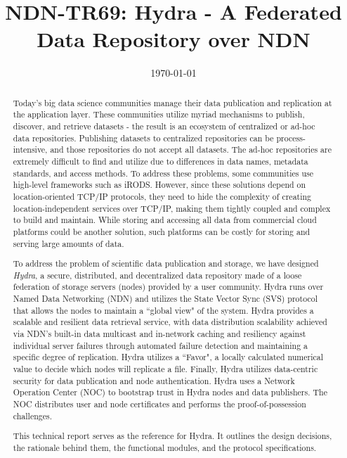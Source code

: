 \documentclass[10pt, sigconf]{acmart}
\begin{document}
\title{NDN-TR69: Hydra - A Federated Data Repository over NDN}
\author{}
\date{\today}

\tableofcontents
\begin{abstract}
Today's big data science communities manage their data publication and replication at the application layer. These communities utilize myriad mechanisms to publish, discover, and retrieve datasets - the result is an ecosystem of centralized or ad-hoc data repositories. Publishing datasets to centralized repositories can be process-intensive, and those repositories do not accept all datasets. The ad-hoc repositories are extremely difficult to find and utilize due to differences in data names, metadata standards, and access methods. To address these problems, some communities use high-level frameworks such as iRODS. However,  since these solutions depend on location-oriented TCP/IP protocols, they need to hide the complexity of creating location-independent services over TCP/IP, making them tightly coupled and complex to build and maintain. While storing and accessing all data from commercial cloud platforms could be another solution, such platforms can be costly for storing and serving large amounts of data.

To address the problem of scientific data publication and storage, we have designed \textit{Hydra}, a secure, distributed, and decentralized data repository made of a loose federation of storage servers (nodes) provided by a user community. Hydra runs over Named Data Networking (NDN) and utilizes the State Vector Sync (SVS) protocol that allows the nodes to maintain a ``global view" of the system. Hydra provides a scalable and resilient data retrieval service, with data distribution scalability achieved via NDN's built-in data multicast and in-network caching and resiliency against individual server failures through automated failure detection and maintaining a specific degree of replication. Hydra utilizes a ``Favor", a locally calculated numerical value to decide which nodes will replicate a file.
Finally, Hydra utilizes data-centric security for data publication and node authentication. Hydra uses a Network Operation Center (NOC) to bootstrap trust in Hydra nodes and data publishers. The NOC distributes user and node certificates and performs the proof-of-possession challenges. 

This technical report serves as the reference for Hydra. It outlines the design decisions, the rationale behind them, the functional modules, and the protocol specifications. 
\end{abstract}
\maketitle
\pagestyle{plain}
\end{document}
